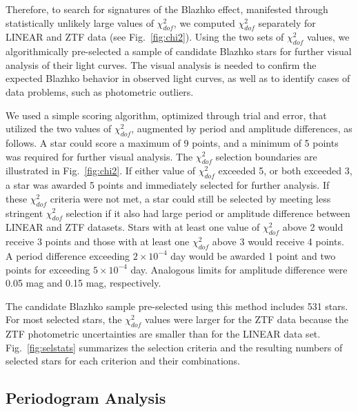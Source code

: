 Therefore, to search for signatures of the Blazhko effect, manifested through statistically unlikely large values
of $\chi^2_{dof}$, we computed $\chi^2_{dof}$ separately for LINEAR and ZTF data (see Fig.~\ref{fig:chi2}). 
Using the two sets of $\chi^2_{dof}$ values, we algorithmically pre-selected a sample of candidate Blazhko stars
for further visual analysis of their light curves. The visual analysis is needed to confirm the expected Blazhko behavior
in observed light curves, as well as to identify cases of data problems, such as photometric outliers. 

We used a simple scoring algorithm, optimized through trial and error, that utilized the two values of $\chi^2_{dof}$,
augmented by period and amplitude differences, as follows. A star could score a maximum of 9 points,
and a minimum of 5 points was required for further visual analysis. The $\chi^2_{dof}$ selection boundaries are 
illustrated in Fig.~\ref{fig:chi2}. If either value of $\chi^2_{dof}$
exceeded 5, or both exceeded 3, a star was awarded 5 points and immediately selected
for further analysis. If these $\chi^2_{dof}$ criteria were not met, a
star could still be selected by meeting less stringent $\chi^2_{dof}$
selection if it also had large period or amplitude difference between
LINEAR and ZTF datasets. Stars with at least one value of $\chi^2_{dof}$
above 2 would receive 3 points and those with at least one
$\chi^2_{dof}$ above 3 would receive 4 points. A period
difference exceeding $2\times10^{-4}$ day would be awarded 1 point
and two points for exceeding $5\times10^{-4}$ day. Analogous limits
for amplitude difference were 0.05 mag and 0.15 mag, respectively. 
 
The candidate Blazhko sample pre-selected using this method includes 531 stars. For most selected stars,
the $\chi^2_{dof}$ values were larger for the ZTF data because the ZTF photometric uncertainties are smaller
than for the LINEAR data set.  Fig.~\ref{fig:selstats} summarizes the selection criteria and the resulting numbers of
selected stars for each criterion and their combinations. 
 


\subsection{Periodogram Analysis} 


